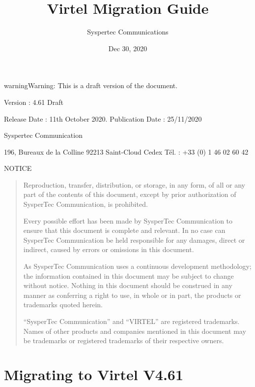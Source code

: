 \documentclass[letterpaper,10pt,english]{sphinxmanual}
\title{Virtel Migration Guide}
\date{Dec 30, 2020}
\author{Syspertec Communications}
\begin{document}
\pagestyle{empty}
\sphinxmaketitle
\pagestyle{plain}
\sphinxtableofcontents
\pagestyle{normal}
\label{\detokenize{Migration_Guide::doc}}



\begin{sphinxadmonition}{warning}{Warning:}
This is a draft version of the document.
\end{sphinxadmonition}

Version : 4.61 Draft

Release Date : 11th October 2020. Publication Date : 25/11/2020

Syspertec Communication

196, Bureaux de la Colline 92213 Saint-Cloud Cedex Tél. : +33 (0) 1 46 02 60 42


NOTICE
\begin{quote}

Reproduction, transfer, distribution, or storage, in any form, of all or any part of
the contents of this document, except by prior authorization of SysperTec
Communication, is prohibited.

Every possible effort has been made by SysperTec Communication to ensure that this document
is complete and relevant. In no case can SysperTec Communication be held responsible for
any damages, direct or indirect, caused by errors or omissions in this document.

As SysperTec Communication uses a continuous development methodology; the information
contained in this document may be subject to change without notice. Nothing in this
document should be construed in any manner as conferring a right to use, in whole or in
part, the products or trademarks quoted herein.

“SysperTec Communication” and “VIRTEL” are registered trademarks. Names of other products
and companies mentioned in this document may be trademarks or registered trademarks of
their respective owners.
\end{quote}

\newpage

\ignorespaces 

\chapter{Migrating to Virtel V4.61}
\label{\detokenize{Migration_Guide:migrating-to-virtel-v4-60}}\label{\detokenize{Migration_Guide:v460mi-introduction}}\label{\detokenize{Migration_Guide:index-0}}
\end{document}
